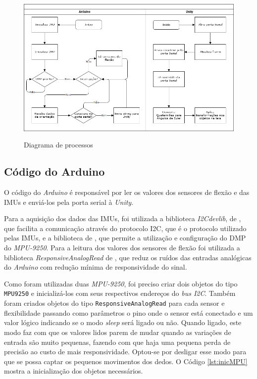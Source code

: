 \begin{figure}[H]
  \setlength{\abovecaptionskip}{0pt}
  \setlength{\belowcaptionskip}{0pt}
  \caption[Diagrama de processos]{Diagrama de processos}
  \centering
  \includegraphics[width=\textwidth]{imagem/processos}
  \captionsetup{justification=centering}
  \label{fig:proc}
\end{figure}

\subsection{Código do Arduino} %
\label{sub:codigo_do_arduino}
O código do \textit{Arduino} é responsável por ler os valores dos sensores de flexão e das \ac{IMU}s e enviá-los pela porta serial à \textit{Unity}.

Para a aquisição dos dados das \ac{IMU}s, foi utilizada a biblioteca \textit{I2Cdevlib}, de , que facilita a comunicação através do protocolo \ac{I2C}, que é o protocolo utilizado pelas \ac{IMU}s, e a biblioteca de , que permite a utilização e configuração do \ac{DMP} do \textit{MPU-9250}.
Para a leitura dos valores dos sensores de flexão foi utilizada a biblioteca \textit{ResponsiveAnalogRead} de , que reduz os ruídos das entradas analógicas do \textit{Arduino} com redução mínima de responsividade do sinal.

Como foram utilizadas duas \textit{MPU-9250}, foi preciso criar dois objetos do tipo \lstinline!MPU9250! e inicializá-los com seus respectivos endereços do \textit{bus I2C}. Também foram criados objetos do tipo \lstinline!ResponsiveAnalogRead! para cada sensor e flexibilidade passando como parâmetros o pino onde o sensor está conectado e um valor lógico indicando se o modo \textit{sleep} será ligado ou não. Quando ligado, este modo faz com que os valores lidos parem de mudar quando as variações de entrada são muito pequenas, fazendo com que haja uma pequena perda de precisão ao custo de mais responsividade. Optou-se por desligar esse modo para que se possa captar os pequenos movimentos dos dedos. O Código \ref{lst:inicMPU} mostra a inicialização dos objetos necessários.

